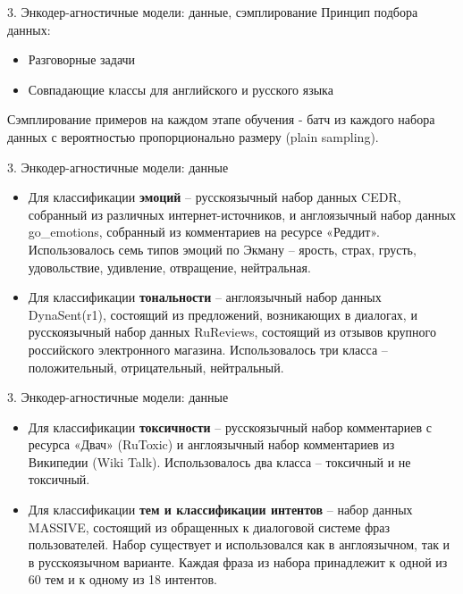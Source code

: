 \begin{frame}{3. Энкодер-агностичные модели: данные, сэмплирование}
Принцип подбора данных:
\begin{itemize}
    \item Разговорные задачи
    \item Совпадающие классы для английского и русского языка
\end{itemize}
Сэмплирование примеров на каждом этапе обучения - батч из каждого набора данных с вероятностью пропорционально размеру (plain sampling).
\end{frame}

\begin{frame}{3. Энкодер-агностичные модели: данные}
\begin{itemize}
    \item Для классификации \textbf{эмоций} -- русскоязычный набор данных CEDR, собранный из различных интернет-источников, и англоязычный набор данных go\_emotions, собранный из комментариев на ресурсе «Реддит». Использовалось семь типов эмоций по Экману -- ярость, страх, грусть, удовольствие, удивление, отвращение, нейтральная.
    \item Для классификации \textbf{тональности} -- англоязычный набор данных DynaSent(r1), состоящий из предложений, возникающих в диалогах, и русскоязычный набор данных RuReviews, состоящий из отзывов крупного российского электронного магазина. Использовалось три класса -- положительный, отрицательный, нейтральный.
\end{itemize}
\end{frame}

\begin{frame}{3. Энкодер-агностичные модели: данные}
\begin{itemize}
    \item Для классификации \textbf{токсичности} -- русскоязычный набор комментариев с ресурса «Двач» (RuToxic) и англоязычный набор комментариев из Википедии (Wiki Talk). Использовалось два класса -- токсичный и не токсичный.
    \item Для классификации \textbf{тем и классификации интентов} -- набор данных MASSIVE, состоящий из обращенных к диалоговой системе фраз пользователей. Набор существует и использовался как в англоязычном, так и в русскоязычном варианте. Каждая фраза из набора принадлежит к одной из 60 тем и к одному из 18 интентов.
\end{itemize}
\end{frame}

